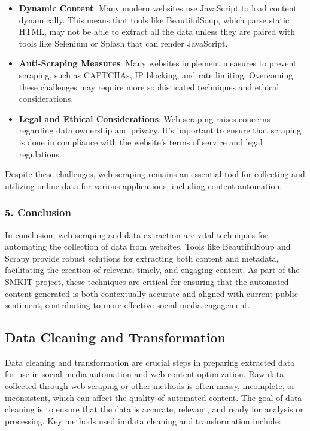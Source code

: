\begin{itemize}
    \item \textbf{Dynamic Content}: Many modern websites use JavaScript to load content dynamically. This means that tools like BeautifulSoup, which parse static HTML, may not be able to extract all the data unless they are paired with tools like Selenium or Splash that can render JavaScript.
    \item \textbf{Anti-Scraping Measures}: Many websites implement measures to prevent scraping, such as CAPTCHAs, IP blocking, and rate limiting. Overcoming these challenges may require more sophisticated techniques and ethical considerations.
    \item \textbf{Legal and Ethical Considerations}: Web scraping raises concerns regarding data ownership and privacy. It's important to ensure that scraping is done in compliance with the website’s terms of service and legal regulations.
\end{itemize}

Despite these challenges, web scraping remains an essential tool for collecting and utilizing online data for various applications, including content automation.

\subsubsection{5. Conclusion}

In conclusion, web scraping and data extraction are vital techniques for automating the collection of data from websites. Tools like BeautifulSoup and Scrapy provide robust solutions for extracting both content and metadata, facilitating the creation of relevant, timely, and engaging content. As part of the SMKIT project, these techniques are critical for ensuring that the automated content generated is both contextually accurate and aligned with current public sentiment, contributing to more effective social media engagement.

\subsection{Data Cleaning and Transformation}
\label{subsec:data_cleaning_and_transformation}

Data cleaning and transformation are crucial steps in preparing extracted data for use in social media automation and web content optimization. Raw data collected through web scraping or other methods is often messy, incomplete, or inconsistent, which can affect the quality of automated content. The goal of data cleaning is to ensure that the data is accurate, relevant, and ready for analysis or processing. Key methods used in data cleaning and transformation include:

